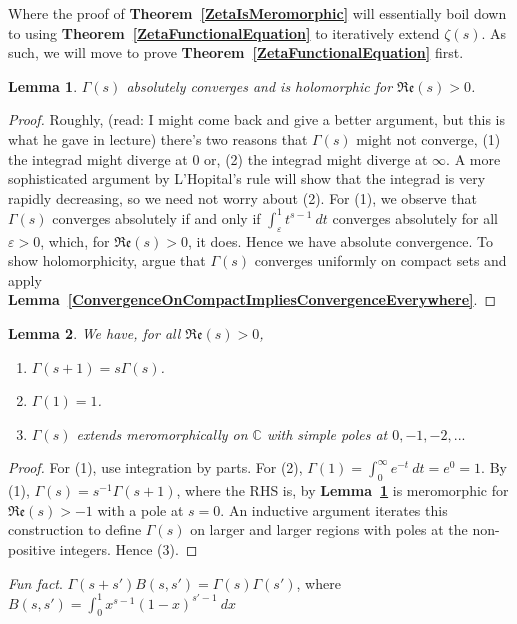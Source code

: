 \documentclass[12pt]{article}
\newcommand{\complex}{\mathbb{C}}
\newcommand{\lref}[1]{\textbf{Lemma~\ref{#1}}}
\newcommand{\tref}[1]{\textbf{Theorem~\ref{#1}}}
\newtheorem{lemma}{Lemma}
\numberwithin{equation}{section}
\numberwithin{thm}{section}
\numberwithin{lemma}{section}
\numberwithin{cor}{section}
\begin{document}
Where the proof of \tref{ZetaIsMeromorphic} will essentially boil down to using \tref{ZetaFunctionalEquation} to iteratively extend $\zeta(s)$. As such, we will move to prove \tref{ZetaFunctionalEquation} first.

\begin{lemma}\label{ConvergenceOfGamma}
  $\Gamma(s)$ absolutely converges and is holomorphic for $\mathfrak{Re}(s) > 0$.
\end{lemma}
\begin{proof}
  Roughly, (read: I might come back and give a better argument, but this is what he gave in lecture) there's two reasons that $\Gamma(s)$ might not converge, (1) the integrad might diverge at $0$ or, (2) the integrad might diverge at $\infty$. A more sophisticated argument by L'Hopital's rule will show that the integrad is very rapidly decreasing, so we need not worry about (2). For (1), we observe that $\Gamma(s)$ converges absolutely if and only if $\int_{\varepsilon}^1 t^{s-1} \ dt$ converges absolutely for all $\varepsilon > 0$, which, for $\mathfrak{Re}(s) > 0$, it does. Hence we have absolute convergence. To show holomorphicity, argue that $\Gamma(s)$ converges uniformly on compact sets and apply \lref{ConvergenceOnCompactImpliesConvergenceEverywhere}.
\end{proof}

\begin{lemma}
  We have, for all $\mathfrak{Re}(s) > 0$, \begin{enumerate}
    \item $\Gamma(s + 1) = s \Gamma(s)$.
    \item $\Gamma(1) = 1$.
    \item $\Gamma(s)$ extends meromorphically on $\complex$ with simple poles at $0, -1, -2, ...$
  \end{enumerate}
\end{lemma}
\begin{proof}
  For (1), use integration by parts. For (2), $\Gamma(1) = \int_0^{\infty} e^{-t} \ dt = e^0 = 1$. By (1), $\Gamma(s) = s^{-1} \Gamma(s + 1)$, where the RHS is, by \lref{ConvergenceOfGamma} is meromorphic for $\mathfrak{Re}(s) > -1$ with a pole at $s = 0$. An inductive argument iterates this construction to define $\Gamma(s)$ on larger and larger regions with poles at the non-positive integers. Hence (3).
\end{proof}

\textit{Fun fact}. $\Gamma(s + s')B(s, s') = \Gamma(s)\Gamma(s')$, where $B(s, s') = \int_0^1 x^{s-1} (1 - x)^{s' - 1} \ dx$
\end{document}
